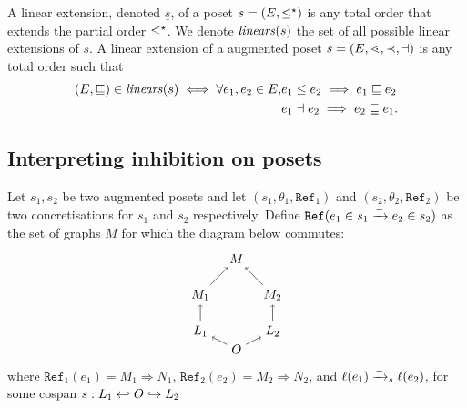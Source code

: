 
\begin{definition}
  A linear extension, denoted $\underline{s}$, of a poset $s=(E,\leq^{\star})$ is any total order that extends the partial order $\leq^{\star}$. We denote $\mathit{linears}(s)$ the set of all possible linear extensions of $s$. A linear extension of a augmented poset $s=(E,\lessdot,\prec,\dashv)$ is any total order such that
  \begin{align*}
    (E,\sqsubseteq)\in\mathit{linears}(s) \iff \forall e_1,e_2\in E, &e_1\leq e_2\implies e_1\sqsubseteq e_2\\
    & e_1\dashv e_2\implies e_2\sqsubseteq e_1.
  \end{align*}
\end{definition}


\subsection{Interpreting inhibition on posets}

\begin{definition}
  \label{def:ref_neg_infl}
  Let $s_1,s_2$ be two augmented posets and let $(s_1,\theta_1,\mathtt{Ref}_1)$ and $(s_2,\theta_2,\mathtt{Ref}_2)$ be two concretisations for $s_1$ and $s_2$ respectively.
  Define $\mathtt{Ref}(e_1\in s_1\mathrel{\xrightarrow{-}} e_2\in s_2)$ as the set of graphs $M$ for which the diagram below commutes:
  \[
  \begin{tikzpicture} %
    \node (o) at (0,-0.5) {\(O\)};
    \node (n) at (0,2) {\(M\)};
    \node (l1) at (-1,0) {\(L_1\)};
    \node (l2) at (1,0) {\(L_2\)};
    \node (n1) at (-1,1) {\(M_1\)};
    \node (n2) at (1,1) {\(M_2\)};
    \draw [->] (l1) -- (n1);
    \draw [->] (l2) -- (n2);
    \draw [->] (o) -- (l1);
    \draw [->] (o) -- (l2);
    \draw [->] (n1) -- (n);
    \draw [->] (n2) -- (n);
  \end{tikzpicture}
  \]
  where $\mathtt{Ref}_1(e_1) = M_1\Rightarrow N_1$, $\mathtt{Ref}_2(e_2) = M_2\Rightarrow N_2$, and $\ell(e_1)\mathrel{\xrightarrow{-}}_s\ell(e_2)$, for some cospan $s:L_1\hookleftarrow O\hookrightarrow L_2$
\end{definition}
